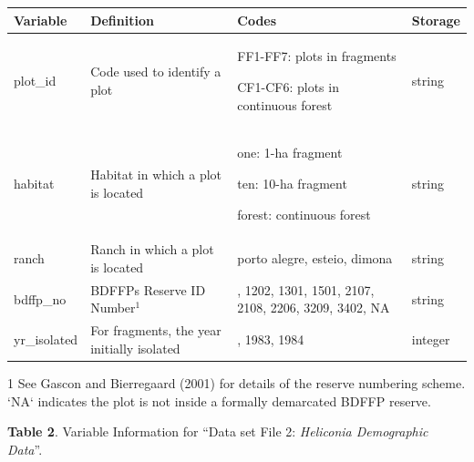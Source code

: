 \documentclass[
  12pt,
  man, donotrepeattitle,floatsintext]{apa6}
\begin{document}
\begin{table}
\centering
\begin{threeparttable}
\begin{tabular}{>{\raggedright\arraybackslash}p{5em}>{\raggedright\arraybackslash}p{18em}>{\raggedright\arraybackslash}p{17em}>{\raggedright\arraybackslash}p{3em}}
\toprule
\textbf{Variable} & \textbf{Definition} & \textbf{Codes} & \textbf{Storage}\\
\midrule
plot\_id & Code used to identify a plot & FF1-FF7: plots in fragments
  
CF1-CF6: plots in continuous forest & string\\
\midrule
habitat & Habitat in which a plot is located & one: 1-ha fragment
  
ten: 10-ha fragment
  
forest: continuous forest & string\\
\midrule
ranch & Ranch in which a plot is located & porto alegre, esteio, dimona & string\\
\midrule
bdffp\_no & BDFFPs Reserve ID Number$^{1}$ & 1104, 1202, 1301, 1501, 2107, 2108, 2206, 3209, 3402, NA & string\\
\midrule
yr\_isolated & For fragments, the year initially isolated & 1980, 1983, 1984 & integer\\
\bottomrule
\end{tabular}
\begin{tablenotes}
\item[1] See Gascon and Bierregaard (2001) for details of the reserve numbering scheme. `NA` indicates the plot is not inside a formally demarcated BDFFP reserve.
\end{tablenotes}
\end{threeparttable}
\end{table}

\newpage

\textbf{Table 2}. Variable Information for ``Data set File 2: \emph{Heliconia Demographic Data}''.
\renewcommand{\arraystretch}{0.5}
\end{document}
